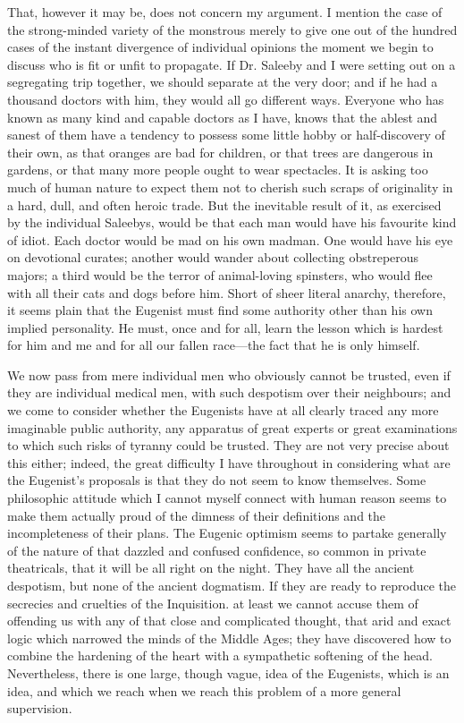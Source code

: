 \documentclass{book}
\begin{document}
That, however it may be, does not concern my argument. I mention the case of the strong-minded variety of the monstrous merely to give one out of the hundred cases of the instant divergence of individual opinions the moment we begin to discuss who is fit or unfit to propagate. If Dr. Saleeby and I were setting out on a segregating trip together, we should separate at the very door; and if he had a thousand doctors with him, they would all go different ways. Everyone who has known as many kind and capable doctors as I have, knows that the ablest and sanest of them have a tendency to possess some little hobby or half-discovery of their own, as that oranges are bad for children, or that trees are dangerous in gardens, or that many more people ought to wear spectacles. It is asking too much of human nature to expect them not to cherish such scraps of originality in a hard, dull, and often heroic trade. But the inevitable result of it, as exercised by the individual Saleebys, would be that each man would have his favourite kind of idiot. Each doctor would be mad on his own madman. One would have his eye on devotional curates; another would wander about collecting obstreperous majors; a third would be the terror of animal-loving spinsters, who would flee with all their cats and dogs before him. Short of sheer literal anarchy, therefore, it seems plain that the Eugenist must find some authority other than his own implied personality. He must, once and for all, learn the lesson which is hardest for him and me and for all our fallen race—the fact that he is only himself.

We now pass from mere individual men who obviously cannot be trusted, even if they are individual medical men, with such despotism over their neighbours; and we come to consider whether the Eugenists have at all clearly traced any more imaginable public authority, any apparatus of great experts or great examinations to which such risks of tyranny could be trusted. They are not very precise about this either; indeed, the great difficulty I have throughout in considering what are the Eugenist’s proposals is that they do not seem to know themselves. Some philosophic attitude which I cannot myself connect with human reason seems to make them actually proud of the dimness of their definitions and the incompleteness of their plans. The Eugenic optimism seems to partake generally of the nature of that dazzled and confused confidence, so common in private theatricals, that it will be all right on the night. They have all the ancient despotism, but none of the ancient dogmatism. If they are ready to reproduce the secrecies and cruelties of the Inquisition. at least we cannot accuse them of offending us with any of that close and complicated thought, that arid and exact logic which narrowed the minds of the Middle Ages; they have discovered how to combine the hardening of the heart with a sympathetic softening of the head. Nevertheless, there is one large, though vague, idea of the Eugenists, which is an idea, and which we reach when we reach this problem of a more general supervision.
\end{document}
